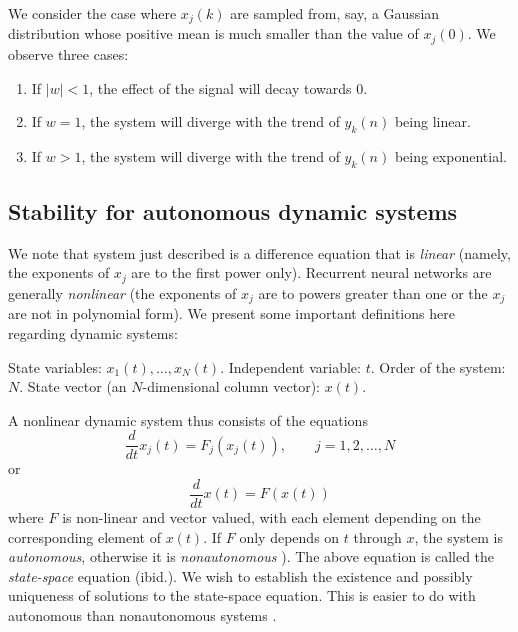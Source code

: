 We consider the case where $x_j(k)$ are sampled from, say, a Gaussian distribution whose positive mean is much smaller than the value of $x_j(0)$. We observe three cases:

\begin{enumerate}
\item If $|w| < 1$, the effect of the signal will decay towards $0$.
\item If $w = 1$, the system will diverge with the trend of $y_k(n)$ being linear. 
\item If $w > 1$, the system will diverge with the trend of $y_k(n)$ being exponential.  
\end{enumerate}

\subsection{Stability for autonomous dynamic systems}

We note that system just described is a difference equation that is \emph{linear} (namely, the exponents of $x_j$ are to the first power only). Recurrent neural networks are generally \emph{nonlinear} (the exponents of $x_j$ are to powers greater than one \cite[p. 6]{strogatz:2000} or the $x_j$ are not in polynomial form). We present some important definitions here regarding dynamic systems:

\begin{definition}
  State variables: $x_1(t), \ldots, x_N(t)$. Independent variable: $t$. Order of the system: $N$. State vector (an $N$-dimensional column vector): $x(t)$.
\end{definition}

A nonlinear dynamic system thus consists of the equations
%
\begin{equation*}
  \frac{d}{dt}x_j(t) = F_j \left(x_j(t)\right), \qquad j = 1, 2, \ldots, N
\end{equation*}
%
or
%
\begin{equation*}
  \frac{d}{dt}x(t) = F \left(x(t)\right)
\end{equation*}
%
where $F$ is non-linear and vector valued, with each element depending on the corresponding element of $x(t)$. If $F$ only depends on $t$ through $x$, the system is \emph{autonomous}, otherwise it is \emph{nonautonomous} \cite[p. 675]{Haykin:2009:NNC:1213811}). The above equation is called the \emph{state-space} equation (ibid.). We wish to establish the existence and possibly uniqueness of solutions to the state-space equation. This is easier to do with autonomous than nonautonomous systems \cite[p. 180]{DBLP:journals/ai/Beer95}.

